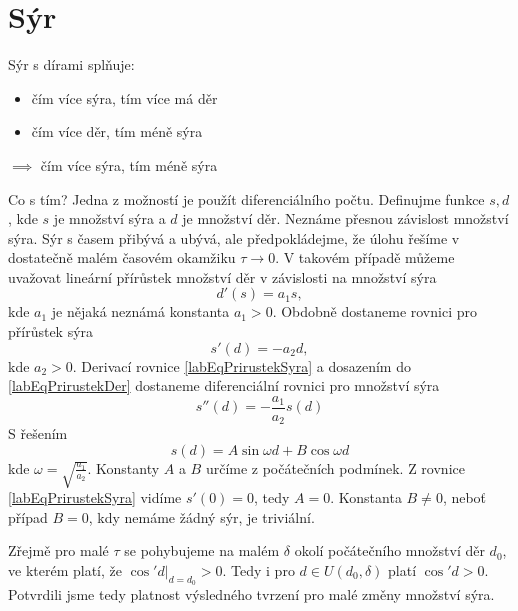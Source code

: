 \documentclass[11pt]{article}
\begin{document}
  \section{Sýr}
  Sýr s dírami splňuje:
  \begin{itemize}
    \item čím více sýra, tím více má děr
    \item čím více děr, tím méně sýra
  \end{itemize}
  \(\implies\) čím více sýra, tím méně sýra 

  Co s tím? Jedna z možností je použít diferenciálního počtu.
  Definujme funkce \(s, d\), kde \(s\) je množství sýra a \(d\) je množství děr.
  Neznáme přesnou závislost množství sýra. Sýr s časem přibývá a ubývá, ale předpokládejme, že úlohu řešíme v dostatečně malém časovém okamžiku \(\tau \to 0\). V takovém případě můžeme uvažovat lineární přírůstek množství děr v závislosti na množství sýra
  \begin{equation}
    d'(s) = a_1 s,
    \label{labEqPrirustekDer}
  \end{equation}
  kde \(a_1\) je nějaká neznámá konstanta \(a_1 > 0\). Obdobně dostaneme rovnici pro přírůstek sýra
  \begin{equation}
    s'(d) = - a_2 d,
    \label{labEqPrirustekSyra}
  \end{equation}
  kde \(a_2 > 0\).
  Derivací rovnice \eqref{labEqPrirustekSyra} a dosazením do \eqref{labEqPrirustekDer} dostaneme diferenciální rovnici pro množství sýra
  \begin{equation}
    s''(d) = -\frac{a_1}{a_2} s(d)
  \end{equation}
  S řešením
  \begin{equation}
    s(d) = A \sin{\omega d} + B \cos{\omega d}
  \end{equation}
  kde \(\omega = \sqrt{\frac{a_1}{a_2}}\). Konstanty \(A\) a \(B\) určíme z počátečních podmínek. Z rovnice \eqref{labEqPrirustekSyra} vidíme \(s'(0) = 0\), tedy \(A = 0\). Konstanta \(B \neq 0\), neboť případ \(B = 0\), kdy nemáme žádný sýr, je triviální.
  
  Zřejmě pro malé \(\tau\) se pohybujeme na malém \(\delta\) okolí počátečního množství děr \(d_0\), ve kterém platí, že \(\cos' d |_{d=d_0} > 0\). Tedy i pro \(d \in U(d_0, \delta) \) platí \(\cos' d > 0\). Potvrdili jsme tedy platnost výsledného tvrzení pro malé změny množství sýra.
\end{document}
